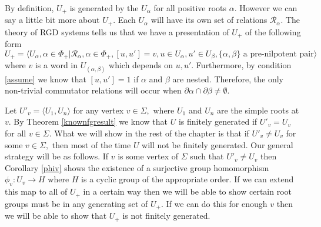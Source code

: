\documentclass[class=book, crop=false,12 pt]{standalone}
\begin{document}
By definition, $U_+$ is generated by the $U_\alpha$ for all positive roots $\alpha.$ However we can say a little bit more about $U_+.$ Each $U_\alpha$ will have its own set of relations $\mathcal{R}_\alpha.$ The theory of RGD systems tells us that we have a presentation of $U_+$ of the following form
\[
	U_+=\langle U_\alpha,\alpha\in \Phi_+|\mathcal{R}_\alpha,\alpha\in \Phi_+,[u,u']=v,u\in U_\alpha,u'\in U_\beta,\{\alpha,\beta\} \text{ a pre-nilpotent pair}\rangle
\]
where $v$ is a word in $U_{(\alpha,\beta)}$ which depends on $u,u'.$ Furthermore, by condition \eqref{assume} we know that $[u,u']=1$ if $\alpha$ and $\beta$ are nested. Therefore, the only non-trivial commutator relations will occur when $\partial\alpha\cap \partial\beta\neq \emptyset.$

Let $U'_v=\langle U_1,U_n\rangle$ for any vertex $v\in \Sigma,$ where $U_1$ and $U_n$ are the simple roots at $v.$ By Theorem \ref{knownfgresult} we know that $U$ is finitely generated if $U'_v=U_v$ for all $v\in \Sigma.$ What we will show in the rest of the chapter is that if $U'_v\neq U_v$ for some $v\in \Sigma,$ then most of the time $U$ will not be finitely generated. Our general strategy will be as follows. If $v$ is some vertex of $\Sigma$ such that $U'_v\neq U_v$ then Corollary \ref{phiv} shows the existence of a surjective group homomorphism $\phi_v:U_v\to H$ where $H$ is a cyclic group of the appropriate order. If we can extend this map to all of $U_+$ in a certain way then we will be able to show certain root groups must be in any generating set of $U_+.$ If we can do this for enough $v$ then we will be able to show that $U_+$ is not finitely generated.
\end{document}
